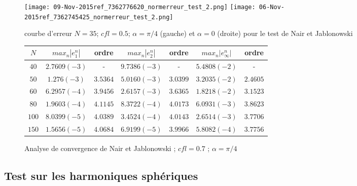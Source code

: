 \begin{figure}[H]
\texttt{[image: 09-Nov-2015ref\_7362776620\_normerreur\_test\_2.png]}
\texttt{[image: 06-Nov-2015ref\_7362745425\_normerreur\_test\_2.png]}
\label{erreur_cfl=0.5}
\caption{courbe d'erreur $N=35$; $cfl=0.5$; $\alpha = \pi / 4$ (gauche) et $\alpha = 0$ (droite) pour le test de Nair et Jablonowski \cite{Nair2008}}
\end{figure}



\begin{figure}
\begin{tabular}{c||cc|cc|cc}
$N$ & $max_n |e_1^n|$ & ordre  & $max_n |e_2^n|$ & ordre  & $max_n |e_{\infty}^n|$ & ordre \\
\hline
\hline
$40$ & $2.7609 (-3)$ & -  & $9.7386 (-3)$ & - & $5.4808 (-2)$  & - \\
\hline 
$50$ & $1.276 (-3)$ & $3.5364$ & $5.0160 (-3)$ & $3.0399$ & $3.2035 (-2)$ & $2.4605$ \\
\hline
$60$ & $6.2957 (-4)$ & $3.9456$ & $2.6157 (-3)$ & $3.6365$ & $1.8218 (-2)$ & $3.1523$ \\
\hline
$80$ & $1.9603 (-4) $ & $4.1145$ & $8.3722 (-4)$ & $4.0173$ & $6.0931 (-3)$ & $3.8623$ \\
\hline
$100$ & $8.0399 (-5)$ & $4.0389$ & $3.4524 (-4)$ & $4.0143$ & $2.6514 (-3)$ & $3.7706$\\
\hline
$150$ & $1.5656 (-5)$ & $4.0684$ & $6.9199 (-5)$ & $3.9966$ & $5.8082 (-4)$ & $3.7756$
\end{tabular}
\caption{Analyse de convergence de Nair et Jablonowski \cite{Nair2008} ; $cfl = 0.7$ ; $\alpha = \pi /4$}
\end{figure}


\subsection{Test sur les harmoniques sphériques}
